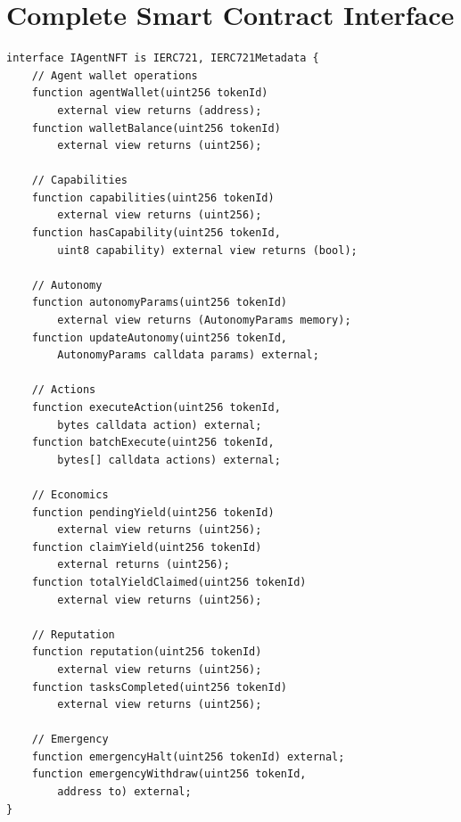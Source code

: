 \section{Complete Smart Contract Interface}


\begin{lstlisting}[language=Solidity,caption=Full IAgentNFT Interface]
interface IAgentNFT is IERC721, IERC721Metadata {
    // Agent wallet operations
    function agentWallet(uint256 tokenId)
        external view returns (address);
    function walletBalance(uint256 tokenId)
        external view returns (uint256);

    // Capabilities
    function capabilities(uint256 tokenId)
        external view returns (uint256);
    function hasCapability(uint256 tokenId,
        uint8 capability) external view returns (bool);

    // Autonomy
    function autonomyParams(uint256 tokenId)
        external view returns (AutonomyParams memory);
    function updateAutonomy(uint256 tokenId,
        AutonomyParams calldata params) external;

    // Actions
    function executeAction(uint256 tokenId,
        bytes calldata action) external;
    function batchExecute(uint256 tokenId,
        bytes[] calldata actions) external;

    // Economics
    function pendingYield(uint256 tokenId)
        external view returns (uint256);
    function claimYield(uint256 tokenId)
        external returns (uint256);
    function totalYieldClaimed(uint256 tokenId)
        external view returns (uint256);

    // Reputation
    function reputation(uint256 tokenId)
        external view returns (uint256);
    function tasksCompleted(uint256 tokenId)
        external view returns (uint256);

    // Emergency
    function emergencyHalt(uint256 tokenId) external;
    function emergencyWithdraw(uint256 tokenId,
        address to) external;
}
\end{lstlisting}

